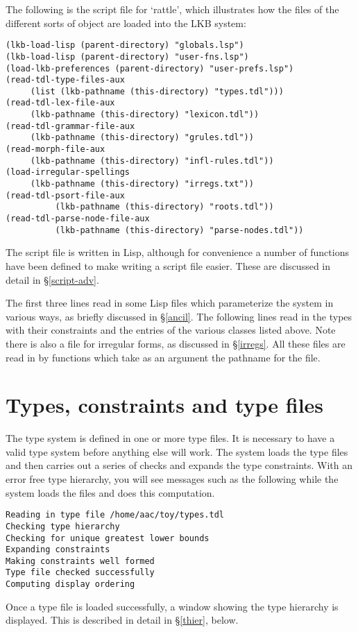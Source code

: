 \documentclass[12pt]{report}
\begin{document}
The following is the script file for `rattle', which illustrates
how the files of the different sorts of object are loaded into the 
LKB system:
\begin{verbatim}
(lkb-load-lisp (parent-directory) "globals.lsp")
(lkb-load-lisp (parent-directory) "user-fns.lsp")
(load-lkb-preferences (parent-directory) "user-prefs.lsp")
(read-tdl-type-files-aux
     (list (lkb-pathname (this-directory) "types.tdl")))
(read-tdl-lex-file-aux 
     (lkb-pathname (this-directory) "lexicon.tdl"))
(read-tdl-grammar-file-aux 
     (lkb-pathname (this-directory) "grules.tdl"))
(read-morph-file-aux 
     (lkb-pathname (this-directory) "infl-rules.tdl"))
(load-irregular-spellings 
     (lkb-pathname (this-directory) "irregs.txt"))
(read-tdl-psort-file-aux 
          (lkb-pathname (this-directory) "roots.tdl"))
(read-tdl-parse-node-file-aux 
          (lkb-pathname (this-directory) "parse-nodes.tdl"))
\end{verbatim}
The script file is written in Lisp, although for convenience
a number of functions have been defined to make writing a script file
easier.  These are discussed in detail in \S\ref{script-adv}.

The first three lines read in some Lisp files which parameterize the
system in various ways, as briefly discussed in \S\ref{ancil}.
The following lines read in the types with their constraints
and the entries of the various
classes listed above.  Note there is also a file for irregular
forms, as discussed in \S\ref{irregs}.  All these files are read
in by functions which take as an argument the pathname for the file.


\section{Types, constraints and type files}

The type system is defined in one or more type files.  It is necessary
to have a valid type system before anything else will work.
The system loads the type files and then carries out a series of
checks and expands the type constraints.
With an error free type hierarchy, you will see messages such as the
following while the system loads the files and
does this computation.
\begin{verbatim}
Reading in type file /home/aac/toy/types.tdl
Checking type hierarchy
Checking for unique greatest lower bounds
Expanding constraints
Making constraints well formed
Type file checked successfully
Computing display ordering
\end{verbatim}
Once a type file is loaded successfully, a window showing the type
hierarchy is displayed. 
This is described in detail in \S\ref{thier}, below.
\end{document}
